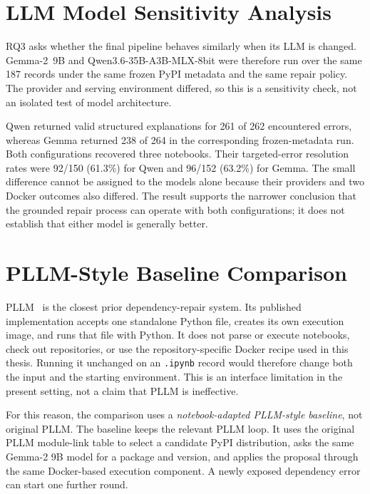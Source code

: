\section{LLM Model Sensitivity Analysis}
\label{sec:v-model-sensitivity}

RQ3 asks whether the final pipeline behaves similarly when its LLM is changed.
Gemma-2~9B and Qwen3.6-35B-A3B-MLX-8bit were therefore run over the same 187
records under the same frozen PyPI metadata and the same repair policy. The
provider and serving environment differed, so this is a sensitivity check, not
an isolated test of model architecture.

Qwen returned valid structured explanations for 261 of 262 encountered errors,
whereas Gemma returned 238 of 264 in the corresponding frozen-metadata run.
Both configurations recovered three notebooks. Their targeted-error resolution
rates were 92/150 (61.3\%) for Qwen and 96/152 (63.2\%) for Gemma. The small
difference cannot be assigned to the models alone because their providers and
two Docker outcomes also differed. The result supports the narrower conclusion
that the grounded repair process can operate with both configurations; it does
not establish that either model is generally better.


\section{PLLM-Style Baseline Comparison}
\label{sec:v-pllm-comparison}

PLLM~\cite{bartlett2025pllm} is the closest prior dependency-repair system.
Its published implementation accepts one standalone Python file, creates its
own execution image, and runs that file with Python. It does not parse or
execute notebooks, check out repositories, or use the repository-specific
Docker recipe used in this thesis. Running it unchanged on an \texttt{.ipynb}
record would therefore change both the input and the starting environment. This
is an interface limitation in the present setting, not a claim that PLLM is
ineffective.

For this reason, the comparison uses a \emph{notebook-adapted PLLM-style
baseline}, not original PLLM. The baseline keeps the relevant PLLM loop. It
uses the original PLLM module-link table to select a candidate PyPI
distribution, asks the same Gemma-2 9B model for a package and version, and
applies the proposal through the same Docker-based execution component. A newly
exposed dependency error can start one further round.

